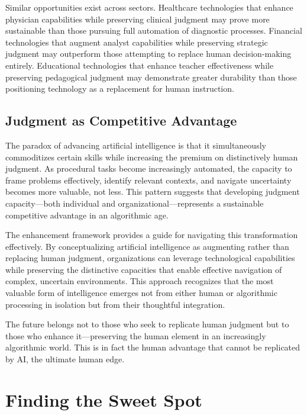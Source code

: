 \documentclass[
  Letterpaper,
]{scrbook}
\begin{document}
Similar opportunities exist across sectors. Healthcare technologies that
enhance physician capabilities while preserving clinical judgment may
prove more sustainable than those pursuing full automation of diagnostic
processes. Financial technologies that augment analyst capabilities
while preserving strategic judgment may outperform those attempting to
replace human decision-making entirely. Educational technologies that
enhance teacher effectiveness while preserving pedagogical judgment may
demonstrate greater durability than those positioning technology as a
replacement for human instruction.

\section{\texorpdfstring{Judgment as Competitive
Advantage}{Judgment as Competitive Advantage}}\label{judgment-as-competitive-advantage}

The paradox of advancing artificial intelligence is that it
simultaneously commoditizes certain skills while increasing the premium
on distinctively human judgment. As procedural tasks become increasingly
automated, the capacity to frame problems effectively, identify relevant
contexts, and navigate uncertainty becomes more valuable, not less. This
pattern suggests that developing judgment capacity---both individual and
organizational---represents a sustainable competitive advantage in an
algorithmic age.

The enhancement framework provides a guide for navigating this
transformation effectively. By conceptualizing artificial intelligence
as augmenting rather than replacing human judgment, organizations can
leverage technological capabilities while preserving the distinctive
capacities that enable effective navigation of complex, uncertain
environments. This approach recognizes that the most valuable form of
intelligence emerges not from either human or algorithmic processing in
isolation but from their thoughtful integration.

The future belongs not to those who seek to replicate human judgment but
to those who enhance it---preserving the human element in an
increasingly algorithmic world. This is in fact the human advantage that
cannot be replicated by AI, the ultimate human edge.


\chapter{Finding the Sweet Spot}\label{finding-the-sweet-spot}
\end{document}
